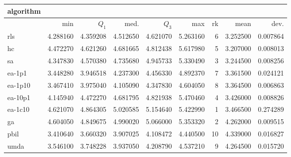 \begin{tabular}{@{}l*{5}{>{{}}N{1}{2}}>{{}}N{2}{0}N{1}{3}N{1}{3}@{}}
\toprule
{algorithm} &  &  \\
\midrule
& {min} & {$Q_1$} & {med.} & {$Q_3$} & {max} & {rk} & {mean} & {dev.} \\
\midrule
rls & 4.288160 & 4.359208 & 4.512650 & 4.621070 & 5.263160 & 6 & 3.252500 & 0.007864 \\
 hc & 4.472270 & 4.621260 & 4.681665 & 4.812438 & {\color{blue}} 5.617980 & 5 & 3.207000 & 0.008013 \\
 sa & 4.347830 & 4.570380 & 4.735680 & 4.945733 & 5.330490 & 3 & 3.244500 & 0.008256 \\
 ea-1p1 & 3.448280 & 3.946518 & 4.237300 & 4.456330 & 4.892370 & 7 & 3.361500 & 0.024121 \\
 ea-1p10 & 3.467410 & 3.975040 & 4.105090 & 4.347830 & 4.604050 & 8 & 3.364500 & 0.006863 \\
 ea-10p1 & 4.145940 & 4.472270 & 4.681795 & 4.821938 & 5.470460 & 4 & 3.426000 & 0.008826 \\
 ea-1c10 & {\color{blue}} 4.621070 & {\color{blue}} 4.864305 & {\color{blue}} 5.020585 & {\color{blue}} 5.154640 & 5.422990 & 1 & 3.466500 & 0.274289 \\
 ga & 4.604050 & 4.849675 & 4.990020 & 5.066000 & 5.353320 & 2 & 4.262000 & 0.009515 \\
 pbil & 3.410640 & 3.660320 & 3.907025 & 4.108472 & 4.440500 & 10 & 4.339000 & 0.016827 \\
 umda & 3.546100 & 3.748228 & 3.937050 & 4.208790 & 4.537210 & 9 & 4.264500 & 0.015720 \\
 \bottomrule
\end{tabular}
